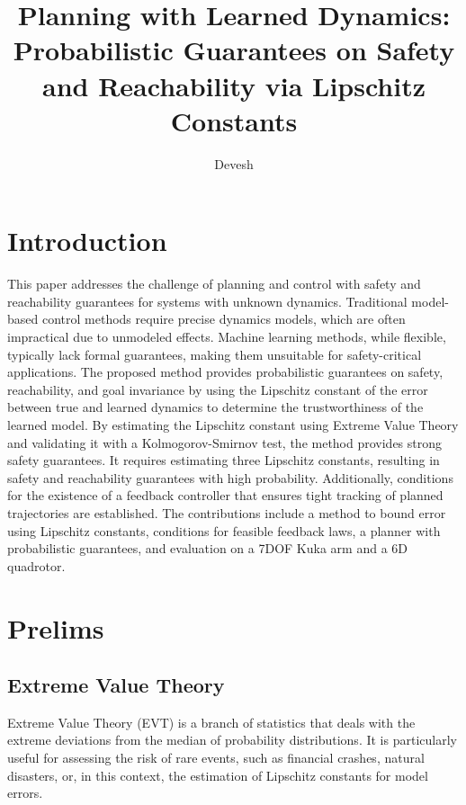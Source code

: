 \documentclass{article}
\title{Planning with Learned Dynamics: Probabilistic Guarantees on Safety and Reachability via Lipschitz Constants}
\author{Devesh}
\begin{document}
\maketitle

\raggedbottom

\section{Introduction}
This paper addresses the challenge of planning and control with safety and reachability guarantees for systems with unknown dynamics. Traditional model-based control methods require precise dynamics models, which are often impractical due to unmodeled effects. Machine learning methods, while flexible, typically lack formal guarantees, making them unsuitable for safety-critical applications. The proposed method provides probabilistic guarantees on safety, reachability, and goal invariance by using the Lipschitz constant of the error between true and learned dynamics to determine the trustworthiness of the learned model. By estimating the Lipschitz constant using Extreme Value Theory and validating it with a Kolmogorov-Smirnov test, the method provides strong safety guarantees. It requires estimating three Lipschitz constants, resulting in safety and reachability guarantees with high probability. Additionally, conditions for the existence of a feedback controller that ensures tight tracking of planned trajectories are established. The contributions include a method to bound error using Lipschitz constants, conditions for feasible feedback laws, a planner with probabilistic guarantees, and evaluation on a 7DOF Kuka arm and a 6D quadrotor.


\section{Prelims}
\subsection{Extreme Value Theory}
Extreme Value Theory (EVT) is a branch of statistics that deals with the extreme deviations from the median of probability distributions. It is particularly useful for assessing the risk of rare events, such as financial crashes, natural disasters, or, in this context, the estimation of Lipschitz constants for model errors.
\end{document}
